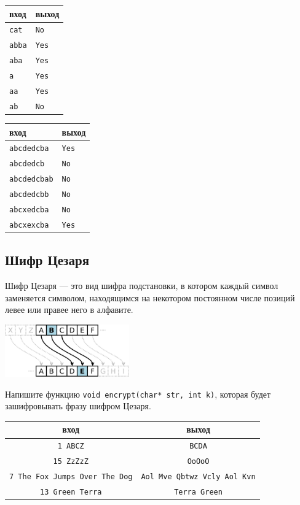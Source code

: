\documentclass{article}
\begin{document}
\begin{multicols}{2}
\begin{center}
\begin{tabular}{ l | l }
 вход & выход \\ \hline
 \texttt{cat} & \texttt{No} \\
 \texttt{abba} & \texttt{Yes} \\
 \texttt{aba} & \texttt{Yes} \\
 \texttt{a} & \texttt{Yes} \\
 \texttt{aa} & \texttt{Yes} \\
 \texttt{ab} & \texttt{No} 
\end{tabular}
\end{center}


\begin{center}
\begin{tabular}{ l | l }
 вход & выход \\ \hline
 \texttt{abcdedcba} & \texttt{Yes} \\
 \texttt{abcdedcb} & \texttt{No} \\
 \texttt{abcdedcbab} & \texttt{No} \\
 \texttt{abcdedcbb} & \texttt{No} \\
 \texttt{abcxedcba} & \texttt{No} \\
 \texttt{abcxexcba} & \texttt{Yes} 
\end{tabular}
\end{center}
\end{multicols}

\subsection{Шифр Цезаря}
Шифр Цезаря — это вид шифра подстановки, в котором каждый символ заменяется символом, находящимся на некотором постоянном числе позиций левее или правее него в алфавите. 
\begin{center}
\includegraphics[width=0.4\textwidth]{../images/caesar.png}
\end{center}
Напишите функцию \texttt{void encrypt(char* str, int k)}, которая будет зашифровывать фразу шифром Цезаря.
\begin{center}
\begin{tabular}{ c | c }
 вход & выход \\ \hline
 \texttt{1 ABCZ} & \texttt{BCDA}\\
 \texttt{15 ZzZzZ} & \texttt{OoOoO} \\
 \texttt{7 The Fox Jumps Over The Dog} & \texttt{Aol Mve Qbtwz Vcly Aol Kvn} \\
 \texttt{13  Green Terra} & \texttt{Terra Green}
\end{tabular}
\end{center}
\end{document}
